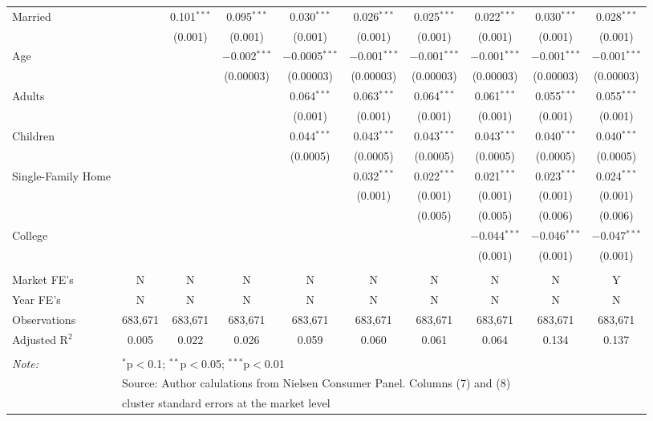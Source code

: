 \begin{table}[!htbp]
\begin{tabular}{@{\extracolsep{5pt}}lccccccccc}
  Married &  & 0.101$^{***}$ & 0.095$^{***}$ & 0.030$^{***}$ & 0.026$^{***}$ & 0.025$^{***}$ & 0.022$^{***}$ & 0.030$^{***}$ & 0.028$^{***}$ \\ 
  &  & (0.001) & (0.001) & (0.001) & (0.001) & (0.001) & (0.001) & (0.001) & (0.001) \\ 
  Age &  &  & $-$0.002$^{***}$ & $-$0.0005$^{***}$ & $-$0.001$^{***}$ & $-$0.001$^{***}$ & $-$0.001$^{***}$ & $-$0.001$^{***}$ & $-$0.001$^{***}$ \\ 
  &  &  & (0.00003) & (0.00003) & (0.00003) & (0.00003) & (0.00003) & (0.00003) & (0.00003) \\ 
  Adults &  &  &  & 0.064$^{***}$ & 0.063$^{***}$ & 0.064$^{***}$ & 0.061$^{***}$ & 0.055$^{***}$ & 0.055$^{***}$ \\ 
  &  &  &  & (0.001) & (0.001) & (0.001) & (0.001) & (0.001) & (0.001) \\ 
  Children &  &  &  & 0.044$^{***}$ & 0.043$^{***}$ & 0.043$^{***}$ & 0.043$^{***}$ & 0.040$^{***}$ & 0.040$^{***}$ \\ 
  &  &  &  & (0.0005) & (0.0005) & (0.0005) & (0.0005) & (0.0005) & (0.0005) \\ 
  Single-Family Home &  &  &  &  & 0.032$^{***}$ & 0.022$^{***}$ & 0.021$^{***}$ & 0.023$^{***}$ & 0.024$^{***}$ \\ 
  &  &  &  &  & (0.001) & (0.001) & (0.001) & (0.001) & (0.001) \\ 
  &  &  &  &  &  & (0.005) & (0.005) & (0.006) & (0.006) \\ 
  College &  &  &  &  &  &  & $-$0.044$^{***}$ & $-$0.046$^{***}$ & $-$0.047$^{***}$ \\ 
  &  &  &  &  &  &  & (0.001) & (0.001) & (0.001) \\ 
 \hline \\[-1.8ex] 
Market FE's & N & N & N & N & N & N & N & N & Y \\ 
Year FE's & N & N & N & N & N & N & N & N & N \\ 
Observations & 683,671 & 683,671 & 683,671 & 683,671 & 683,671 & 683,671 & 683,671 & 683,671 & 683,671 \\ 
Adjusted R$^{2}$ & 0.005 & 0.022 & 0.026 & 0.059 & 0.060 & 0.061 & 0.064 & 0.134 & 0.137 \\ 
\hline 
\hline \\[-1.8ex] 
\textit{Note:}  & \multicolumn{9}{l}{$^{*}$p$<$0.1; $^{**}$p$<$0.05; $^{***}$p$<$0.01} \\ 
 & \multicolumn{9}{l}{Source: Author calulations from Nielsen Consumer Panel. Columns (7) and (8) } \\ 
 & \multicolumn{9}{l}{cluster standard errors at the market level} \\ 
\end{tabular} 
\end{table} 
